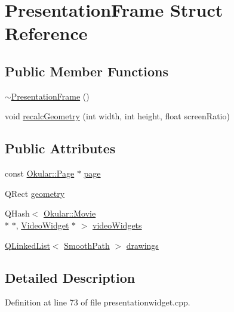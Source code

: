 \hypertarget{structPresentationFrame}{\section{Presentation\+Frame Struct Reference}
\label{structPresentationFrame}
}
\subsection*{Public Member Functions}
\begin{DoxyCompactItemize}
\item 
\hyperlink{structPresentationFrame_ae398f4b35fb35eaeb4894fdc427bac89}{$\sim$\+Presentation\+Frame} ()
\item 
void \hyperlink{structPresentationFrame_a85b9ae3dd422b180b6fe976dd6719c3e}{recalc\+Geometry} (int width, int height, float screen\+Ratio)
\end{DoxyCompactItemize}
\subsection*{Public Attributes}
\begin{DoxyCompactItemize}
\item 
const \hyperlink{classOkular_1_1Page}{Okular\+::\+Page} $\ast$ \hyperlink{structPresentationFrame_ab40e6871a08519f4f2c97d3f1009f2a5}{page}
\item 
Q\+Rect \hyperlink{structPresentationFrame_af80fd4c4305934bb3723aec0b7f72bcf}{geometry}
\item 
Q\+Hash$<$ \hyperlink{classOkular_1_1Movie}{Okular\+::\+Movie} \\*
$\ast$, \hyperlink{classVideoWidget}{Video\+Widget} $\ast$ $>$ \hyperlink{structPresentationFrame_ace9a73ff662d4d93b3f9d7d22f6630cd}{video\+Widgets}
\item 
\hyperlink{classQLinkedList}{Q\+Linked\+List}$<$ \hyperlink{classSmoothPath}{Smooth\+Path} $>$ \hyperlink{structPresentationFrame_ac7a2505dbc93ec1dde1851cbfcdc11a8}{drawings}
\end{DoxyCompactItemize}


\subsection{Detailed Description}


Definition at line 73 of file presentationwidget.\+cpp.




